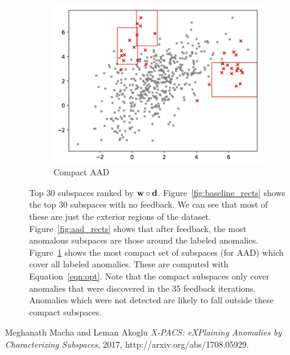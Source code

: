 \documentclass{article} %
\begin{document}
\begin{figure}
	\begin{subfigure}[b]{0.3\textwidth}
		\includegraphics[width=\textwidth]{top_30_anomalous_regions_100_trees_compact}
		\caption{Compact AAD}
		\label{fig:compact_rects}
	\end{subfigure}
	\caption{Top $30$ subspaces ranked by ${\bf w}\circ{\bf d}$. Figure~\ref{fig:baseline_rects} shows the top $30$ subspaces with no feedback. We can see that most of these are just the exterior regions of the dataset. Figure~\ref{fig:aad_rects} shows that after feedback, the most anomalous subspaces are those around the labeled anomalies. Figure~\ref{fig:compact_rects} shows the most compact set of subspaces (for AAD) which cover all labeled anomalies. These are computed with Equation~\ref{eqn:opt}. Note that the compact subspaces only cover anomalies that were discovered in the $35$ feedback iterations. Anomalies which were not detected are likely to fall outside these compact subspaces.} \label{fig:rects}
\end{figure}

\begin{thebibliography}{1}
 Meghanath Macha and Leman Akoglu {\em {X-PACS:} eXPlaining Anomalies by Characterizing Subspaces},  2017, http://arxiv.org/abs/1708.05929.
\end{thebibliography}
\end{document}
